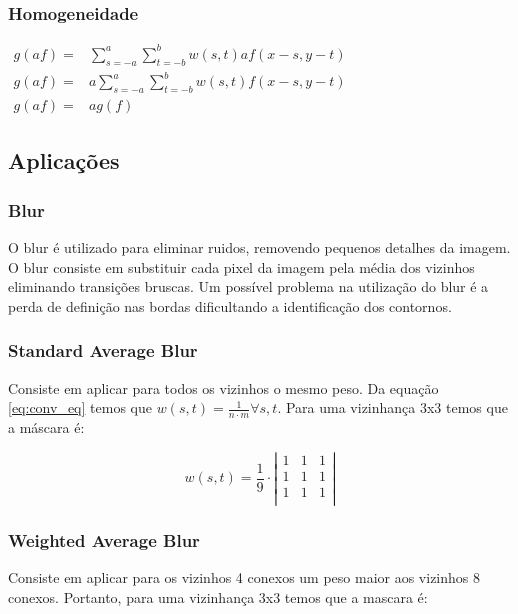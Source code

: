 \documentclass[10pt,a4paper]{article}
\begin{document}
\subsubsection{Homogeneidade}
\begin{center}
    $\begin{aligned}
        g(a f) = &\sum_{s = -a}^{a}\sum_{t = -b}^{b}w(s,t) a f(x - s, y - t) \\
        g(a f) = &a \sum_{s = -a}^{a}\sum_{t = -b}^{b}w(s,t) f(x - s, y - t) \\
        g(a f) = &a g(f)
    \end{aligned}$
\end{center}

\subsection{Aplicações}
\subsubsection{Blur}
O blur é utilizado para eliminar ruidos, removendo pequenos detalhes da imagem. O blur consiste em substituir cada pixel da imagem pela média dos vizinhos eliminando transições bruscas. Um possível problema na utilização do blur é a perda de definição nas bordas dificultando a identificação dos contornos.

\subsubsection*{Standard Average Blur}
Consiste em aplicar para todos os vizinhos o mesmo peso. Da equação \ref{eq:conv_eq} temos que $w(s,t) = \frac{1}{n \cdot m} \forall s,t$. Para uma vizinhança 3x3 temos que a máscara é:

\[ w(s,t) = \frac{1}{9} \cdot \left|
    \begin{array}{ccc}
        1 & 1 & 1 \\
        1 & 1 & 1 \\
        1 & 1 & 1 \\
\end{array}\right|\]

\subsubsection*{Weighted Average Blur}
Consiste em aplicar para os vizinhos 4 conexos um peso maior aos vizinhos 8 conexos. Portanto, para uma vizinhança 3x3 temos que a mascara é:
\end{document}
